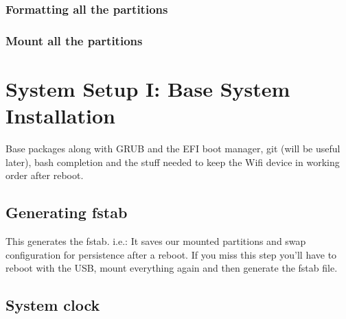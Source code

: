 \subsubsection{Formatting all the partitions}


\subsubsection{Mount all the partitions}


\section{System Setup I: Base System Installation}

\begin{blocksection}
    Base packages along with GRUB and the EFI boot manager, git (will be useful later), bash completion and the stuff needed to keep the Wifi device in working order after reboot.
\end{blocksection}

\subsection{Generating fstab}

\begin{blocksection}
    This generates the fstab. i.e.: It saves our mounted partitions and swap configuration for persistence after a reboot. If you miss this step you'll have to reboot with the USB, mount everything again and then generate the fstab file.
\end{blocksection}

\subsection{System clock}


